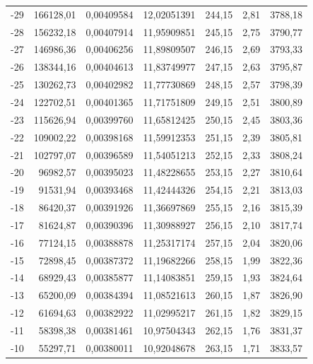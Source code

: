\documentclass[12pt,a4paper,final,twoside,fleqn]{article}
\begin{document}
\begin{ThreePartTable}
\begin{longtable}{rrrrrrr}
-29          & 166128,01 & 0,00409584    & 12,02051391 & 244,15     & 2,81       & 3788,18 \\
-28          & 156232,18 & 0,00407914    & 11,95909851 & 245,15     & 2,75       & 3790,77 \\
-27          & 146986,36 & 0,00406256    & 11,89809507 & 246,15     & 2,69       & 3793,33 \\
-26          & 138344,16 & 0,00404613    & 11,83749977 & 247,15     & 2,63       & 3795,87 \\
-25          & 130262,73 & 0,00402982    & 11,77730869 & 248,15     & 2,57       & 3798,39 \\
-24          & 122702,51 & 0,00401365    & 11,71751809 & 249,15     & 2,51       & 3800,89 \\
-23          & 115626,94 & 0,00399760    & 11,65812425 & 250,15     & 2,45       & 3803,36 \\
-22          & 109002,22 & 0,00398168    & 11,59912353 & 251,15     & 2,39       & 3805,81 \\
-21          & 102797,07 & 0,00396589    & 11,54051213 & 252,15     & 2,33       & 3808,24 \\
-20          & 96982,57  & 0,00395023    & 11,48228655 & 253,15     & 2,27       & 3810,64 \\
-19          & 91531,94  & 0,00393468    & 11,42444326 & 254,15     & 2,21       & 3813,03 \\
-18          & 86420,37  & 0,00391926    & 11,36697869 & 255,15     & 2,16       & 3815,39 \\
-17          & 81624,87  & 0,00390396    & 11,30988927 & 256,15     & 2,10       & 3817,74 \\
-16          & 77124,15  & 0,00388878    & 11,25317174 & 257,15     & 2,04       & 3820,06 \\
-15          & 72898,45  & 0,00387372    & 11,19682266 & 258,15     & 1,99       & 3822,36 \\
-14          & 68929,43  & 0,00385877    & 11,14083851 & 259,15     & 1,93       & 3824,64 \\
-13          & 65200,09  & 0,00384394    & 11,08521613 & 260,15     & 1,87       & 3826,90 \\
-12          & 61694,63  & 0,00382922    & 11,02995217 & 261,15     & 1,82       & 3829,15 \\
-11          & 58398,38  & 0,00381461    & 10,97504343 & 262,15     & 1,76       & 3831,37 \\
-10          & 55297,71  & 0,00380011    & 10,92048678 & 263,15     & 1,71       & 3833,57 \\

\end{longtable}
\end{ThreePartTable}
\end{document}

